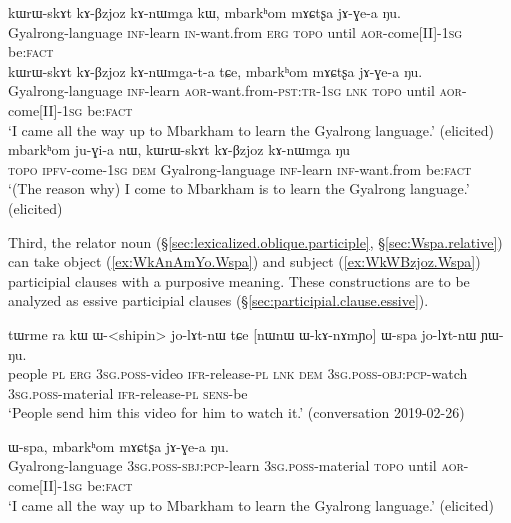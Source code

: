 \begin{exe}
\ex 
\begin{xlist}
\ex \label{ex:kABzjoz.kAnWmga}
\gll kɯrɯ-skɤt kɤ-βzjoz kɤ-nɯmga kɯ, mbarkʰom mɤɕtʂa jɤ-ɣe-a ŋu. \\
Gyalrong-language \textsc{inf}-learn \textsc{in}-want.from  \textsc{erg}  \textsc{topo} until \textsc{aor}-come[II]-\textsc{1sg} be:\textsc{fact} \\
\ex \label{ex:kABzjoz.kAnWmgata}
\gll  kɯrɯ-skɤt kɤ-βzjoz kɤ-nɯmga-t-a tɕe, mbarkʰom mɤɕtʂa jɤ-ɣe-a ŋu. \\
Gyalrong-language \textsc{inf}-learn \textsc{aor}-want.from-\textsc{pst}:\textsc{tr}-\textsc{1sg} \textsc{lnk}  \textsc{topo} until \textsc{aor}-come[II]-\textsc{1sg} be:\textsc{fact} \\
\glt `I came all the way up to Mbarkham to learn the Gyalrong language.' (elicited)
\ex \label{ex:kABzjoz.kAnWmga.Nu}
\gll mbarkʰom ju-ɣi-a nɯ, kɯrɯ-skɤt kɤ-βzjoz kɤ-nɯmga ŋu \\
\textsc{topo} \textsc{ipfv}-come-\textsc{1sg} \textsc{dem} Gyalrong-language \textsc{inf}-learn \textsc{inf}-want.from be:\textsc{fact} \\
\glt `(The reason why) I come to Mbarkham is to learn the Gyalrong language.' (elicited)
\end{xlist}
\end{exe}

Third, the relator noun  (§\ref{sec:lexicalized.oblique.participle}, §\ref{sec:Wspa.relative}) can take object (\ref{ex:WkAnAmYo.Wspa}) and subject (\ref{ex:WkWBzjoz.Wspa}) participial clauses with a purposive meaning. These constructions are to be analyzed as essive participial clauses (§\ref{sec:participial.clause.essive}).

\begin{exe}
\ex \label{ex:WkAnAmYo.Wspa}
\gll tɯrme ra kɯ ɯ-<shipin> jo-lɤt-nɯ tɕe [nɯnɯ ɯ-kɤ-nɤmɲo] ɯ-spa jo-lɤt-nɯ ɲɯ-ŋu. \\
people \textsc{pl} \textsc{erg} \textsc{3sg}.\textsc{poss}-video \textsc{ifr}-release-\textsc{pl} \textsc{lnk} \textsc{dem} \textsc{3sg}.\textsc{poss}-\textsc{obj}:\textsc{pcp}-watch \textsc{3sg}.\textsc{poss}-material \textsc{ifr}-release-\textsc{pl} \textsc{sens}-be \\
\glt `People send him this video for him to watch it.' (conversation 2019-02-26)
\end{exe}

\begin{exe}
\ex \label{ex:WkWBzjoz.Wspa}
 ɯ-spa, mbarkʰom mɤɕtʂa jɤ-ɣe-a ŋu. \\
Gyalrong-language \textsc{3sg}.\textsc{poss}-\textsc{sbj}:\textsc{pcp}-learn \textsc{3sg}.\textsc{poss}-material  \textsc{topo} until \textsc{aor}-come[II]-\textsc{1sg} be:\textsc{fact} \\
\glt `I came all the way up to Mbarkham to learn the Gyalrong language.' (elicited)
\end{exe}

